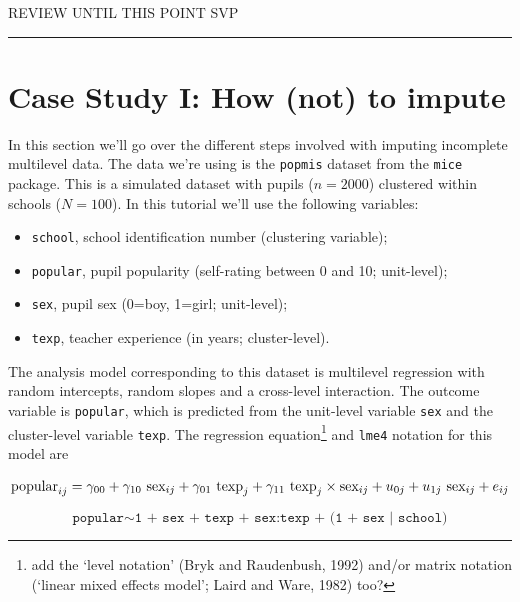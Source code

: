\documentclass[
]{jss}
\providecommand{\tightlist}{%
  \setlength{\itemsep}{0pt}\setlength{\parskip}{0pt}}
\begin{document}
\begin{center}
REVIEW UNTIL THIS POINT SVP
\end{center}

\begin{center}\rule{0.5\linewidth}{0.5pt}\end{center}

\hypertarget{case-study-i-how-not-to-impute}{%
\section{Case Study I: How (not) to
impute}\label{case-study-i-how-not-to-impute}}

In this section we'll go over the different steps involved with imputing
incomplete multilevel data. The data we're using is the \texttt{popmis}
dataset from the \texttt{mice} package. This is a simulated dataset with
pupils (\(n = 2000\)) clustered within schools (\(N = 100\)). In this
tutorial we'll use the following variables:

\begin{itemize}
\tightlist
\item
  \texttt{school}, school identification number (clustering variable);
\item
  \texttt{popular}, pupil popularity (self-rating between 0 and 10;
  unit-level);
\item
  \texttt{sex}, pupil sex (0=boy, 1=girl; unit-level);
\item
  \texttt{texp}, teacher experience (in years; cluster-level).
\end{itemize}

The analysis model corresponding to this dataset is multilevel
regression with random intercepts, random slopes and a cross-level
interaction. The outcome variable is \texttt{popular}, which is
predicted from the unit-level variable \texttt{sex} and the
cluster-level variable \texttt{texp}. The regression equation\footnote{add
  the `level notation' (Bryk and Raudenbush, 1992) and/or matrix
  notation (`linear mixed effects model'; Laird and Ware, 1982) too?}
and \texttt{lme4} notation for this model are

\[
\text{popular}_{ij} =
\gamma_{00} + 
\gamma_{10} \text{ sex}_{ij} + 
\gamma_{01} \text{ texp}_{j} + 
\gamma_{11} \text{ texp}_{j} \times \text{sex}_{ij} + 
u_{0j} + 
u_{1j} \text{ sex}_{ij} + 
e_{ij} \\
\]

\[
\texttt{popular} \sim  \texttt{1 + sex + texp + sex:texp + (1 + sex | school)}
\]
\end{document}

